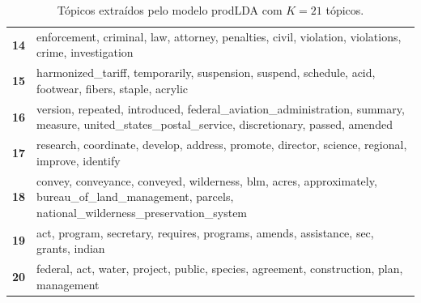\begin{table}[htpb]
\begin{tabularx}{\textwidth}{@{}l X@{}}
        \textbf{14} & enforcement, criminal, law, attorney, penalties, civil, violation, violations, crime, investigation \\
        \textbf{15} & harmonized\_tariff, temporarily, suspension, suspend, schedule, acid, footwear, fibers, staple, acrylic \\
        \textbf{16} & version, repeated, introduced, federal\_aviation\_administration, summary, measure, united\_states\_postal\_service, discretionary, passed, amended \\
        \textbf{17} & research, coordinate, develop, address, promote, director, science, regional, improve, identify \\
        \textbf{18} & convey, conveyance, conveyed, wilderness, blm, acres, approximately, bureau\_of\_land\_management, parcels, national\_wilderness\_preservation\_system \\
        \textbf{19} & act, program, secretary, requires, programs, amends, assistance, sec, grants, indian \\
        \textbf{20} & federal, act, water, project, public, species, agreement, construction, plan, management \\
        \bottomrule
    \end{tabularx}
    \caption{Tópicos extraídos pelo modelo prodLDA com $K=21$ tópicos.}
    \label{tab:topicos_prodlda_21}
\end{table}
